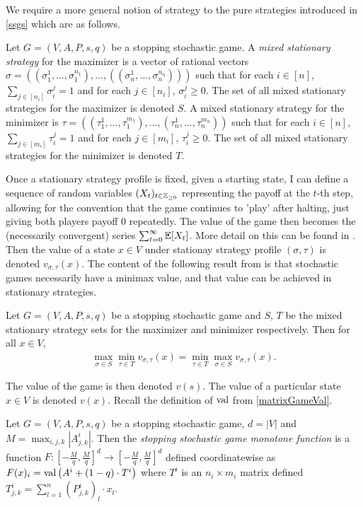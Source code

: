 We require a more general notion of strategy to the pure strategies introduced in \cref{ssgs} which
are as follows.
\begin{definition}
  Let $G = (V, A, P, s, q)$ be a stopping stochastic game. A \emph{mixed stationary strategy}
  for the maximizer is a vector of rational vectors 
  $\sigma = ((\sigma_1^{1}, ..., \sigma_1^{n_1}), ..., ((\sigma_n^{1}, ..., \sigma_n^{n_n})))$ such
  that for each $i \in [n]$, $\sum_{j \in [n_i]} \sigma_i^j = 1$ and for each $j \in [n_i]$, $\sigma_i^j \geq 0$.
  The set of all mixed stationary strategies for the maximizer is denoted $S$.
  A mixed stationary strategy for the minimizer is 
  $\tau = ((\tau_1^{1}, ..., \tau_1^{m_1}), ..., (\tau_n^{1}, ..., \tau_n^{m_n}))$
  such that for each $i \in [n]$, $\sum_{j \in [m_i]} \tau_i^j = 1$ 
  and for each $j \in [m_i]$, $\tau_i^j \geq 0$.
  The set of all mixed stationary strategies for the minimizer is denoted $T$.
\end{definition}
Once a stationary strategy profile is fixed, given a starting state, 
I can define a sequence of random variables
$(X_t)_{t \in \mathbb{Z}_{\geq 0}}$ representing the payoff at the $t$-th step, allowing for the convention
that the game continues to 'play' after halting, just giving both players payoff 0 repeatedly. The value of the game
then becomes the (necessarily convergent) series $\sum_{t = 0}^\infty \mathbb{E}[X_t]$. More detail on this can be found in
\citep{compMdps}. Then the value of a state $x \in V$ 
under stationay strategy profile $(\sigma, \tau)$ is denoted $v_{\sigma, \tau}(x)$. The content of the following
result from \citep{shapley} is that stochastic games necessarily have a minimax value, and that value can be achieved
in stationary strategies.
\begin{prop}
  Let $G = (V, A, P, s, q)$ be a stopping stochastic game and $S$, $T$ be the mixed stationary strategy
  sets for the maximizer and minimizer respectively. Then for all $x \in V$, 
  \begin{align*}
    \max_{\sigma \in S} \min_{\tau \in T} v_{\sigma, \tau}(x) = \min_{\tau \in T} \max_{\sigma \in S} v_{\sigma, \tau}(x).
  \end{align*}
\end{prop}
The value of the game is then denoted $v(s)$. The value of a particular state $x \in V$ is denoted $v(x)$.
Recall the definition of $\mathrm{val}$ from \cref{matrixGameVal}.
\begin{definition} \label{shapleyMonotone}
  Let $G = (V, A, P, s, q)$ be a stopping stochastic game, $d = |V|$ and $M = \max_{i, j, k} |A_{j, k}^i|$. Then the
  \emph{stopping stochastic game monotone function} is a function
  $F : [-\frac{M}{q}, \frac{M}{q}]^d \to [-\frac{M}{q}, \frac{M}{q}]^d$ defined coordinatewise as
  $F(x)_i =  \mathrm{val} \left( A^i + (1 - q) \cdot T^i \right)$ where $T^i$ is an $n_i \times m_i$ matrix defined
  $T^i_{j, k} = \sum_{l = 1}^n (P_{j, k}^i)_l \cdot x_l$.
\end{definition}
